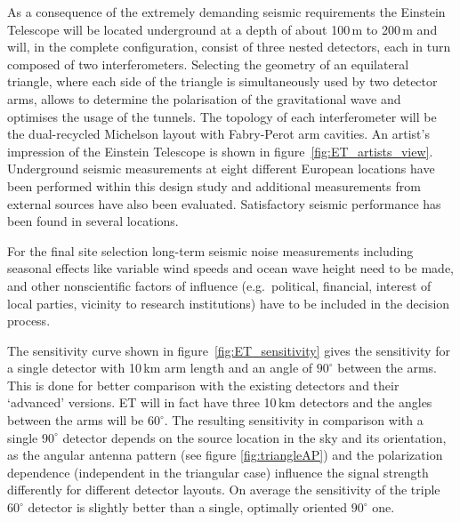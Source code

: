 As a consequence of the extremely demanding seismic requirements the Einstein 
Telescope will be located underground at a depth of about 100\,m to 200\,m and 
will, in the complete configuration, consist of three nested detectors, each in turn 
composed of two interferometers. Selecting the geometry of an equilateral triangle, 
where each side of the triangle is simultaneously used by two detector arms, allows 
to determine the polarisation of the gravitational wave and optimises the usage of 
the tunnels. The topology of each interferometer will be the dual-recycled Michelson 
layout with Fabry-Perot arm cavities. An artist's impression of the Einstein Telescope 
is shown in figure~\ref{fig:ET_artists_view}. \\
Underground seismic measurements at eight different European locations have 
been performed within this design study and additional measurements from 
external sources have also been evaluated. Satisfactory seismic performance has 
been found in several locations. 

For the final site selection long-term seismic noise measurements including 
seasonal effects like variable wind speeds and ocean wave height need to be made, 
and other nonscientific factors of influence (e.g.\ political, financial, interest of local 
parties, vicinity to research institutions) have to be included in the decision process.

The sensitivity curve shown in figure~\ref{fig:ET_sensitivity} gives the sensitivity for 
a single detector with 10\,km arm length and an angle of $90^{\circ}$ between the 
arms. This is done for better comparison with the existing detectors and their 
`advanced' versions. ET will in fact have three 10\,km detectors and the angles 
between the arms will be $60^{\circ}$. The resulting sensitivity in comparison with 
a single $90^{\circ}$ detector depends on the source location in the sky and its 
orientation, as the angular antenna pattern (see figure \ref{fig:triangleAP}) and the 
polarization dependence (independent in the triangular case) influence the signal 
strength differently for different detector layouts. On average the sensitivity of the 
triple $60^{\circ}$ detector is slightly better than a single, optimally oriented $90^{\circ}$ one.



